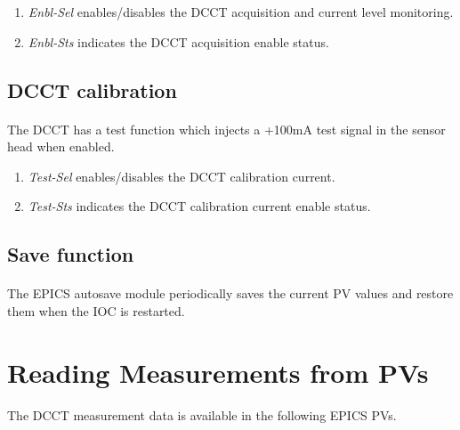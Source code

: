 \documentclass[openany]{article}
\begin{document}
			\begin{enumerate}
				\item \emph{Enbl-Sel} enables/disables the DCCT acquisition and current level monitoring.
				\item \emph{Enbl-Sts} indicates the DCCT acquisition enable status.
			\end{enumerate}

	\subsection{DCCT calibration}

		\paragraph{} The DCCT has a test function which injects a +100mA test signal in the sensor head when enabled.

			\begin{enumerate}
				\item \emph{Test-Sel} enables/disables the DCCT calibration current.
				\item \emph{Test-Sts} indicates the DCCT calibration current enable status.
			\end{enumerate}

	\subsection{Save function}

		\paragraph{} The EPICS autosave module periodically saves the current PV values and restore them when the IOC is restarted.

\section{Reading Measurements from PVs}

	\paragraph{} The DCCT measurement data is available in the following EPICS PVs.
\end{document}
